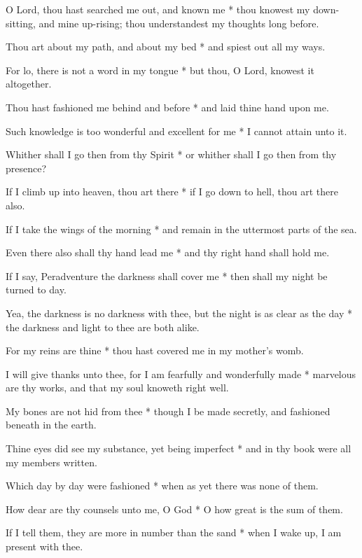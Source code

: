 \begin{multicols}{2}
	
	O Lord, thou hast searched me out, and known me * thou knowest my down-sitting, and mine up-rising; thou understandest my thoughts long before.
	
	Thou art about my path, and about my bed * and spiest out all my ways.
	
	For lo, there is not a word in my tongue * but thou, O Lord, knowest it altogether.
	
	Thou hast fashioned me behind and before * and laid thine hand upon me.
	
	Such knowledge is too wonderful and excellent for me * I cannot attain unto it.
	
	Whither shall I go then from thy Spirit * or whither shall I go then from thy presence?
	
	If I climb up into heaven, thou art there * if I go down to hell, thou art there also.
	
	If I take the wings of the morning * and remain in the uttermost parts of the sea.
	
	Even there also shall thy hand lead me * and thy right hand shall hold me.
	
	If I say, Peradventure the darkness shall cover me * then shall my night be turned to day.
	
	Yea, the darkness is no darkness with thee, but the night is as clear as the day * the darkness and light to thee are both alike.
	
	For my reins are thine * thou hast covered me in my mother's womb.
	
	I will give thanks unto thee, for I am fearfully and wonderfully made * marvelous are thy works, and that my soul knoweth right well.
	
	My bones are not hid from thee * though I be made secretly, and fashioned beneath in the earth.
	
	Thine eyes did see my substance, yet being imperfect * and in thy book were all my members written.
	
	Which day by day were fashioned * when as yet there was none of them.
	
	How dear are thy counsels unto me, O God * O how great is the sum of them.
	
	If I tell them, they are more in number than the sand * when I wake up, I am present with thee.
	

\end{multicols}
